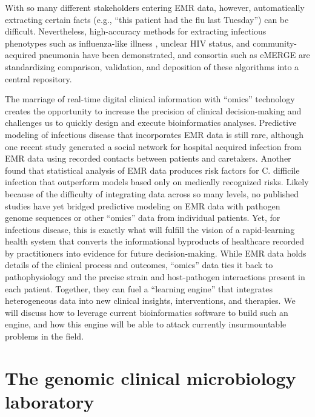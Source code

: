With so many different stakeholders entering EMR data, however, automatically extracting certain facts (e.g., “this patient had the flu last Tuesday”) can be difficult. Nevertheless, high-accuracy methods for extracting infectious phenotypes such as influenza-like illness , unclear HIV status,\autocite{Felsen2014} and community-acquired pneumonia\autocite{DeLisle2013} have been demonstrated, and consortia such as eMERGE are standardizing comparison, validation, and deposition of these algorithms into a central repository.\autocite{Pathak2013a}

The marriage of real-time digital clinical information with “omics” technology creates the opportunity to increase the precision of clinical decision-making and challenges us to quickly design and execute bioinformatics analyses. Predictive modeling of infectious disease that incorporates EMR data is still rare, although one recent study generated a social network for hospital acquired infection from EMR data using recorded contacts between patients and caretakers.\autocite{Cusumano-Towner2013} Another found that statistical analysis of EMR data produces risk factors for C. difficile infection that outperform models based only on medically recognized risks.\autocite{Wiens2014} Likely because of the difficulty of integrating data across so many levels, no published studies have yet bridged predictive modeling on EMR data with pathogen genome sequences or other “omics” data from individual patients. Yet, for infectious disease, this is exactly what will fulfill the vision of a rapid-learning health system \autocite{Care2014,Kohane2012} that converts the informational byproducts of healthcare recorded by practitioners into evidence for future decision-making. While EMR data holds details of the clinical process and outcomes, “omics” data ties it back to pathophysiology and the precise strain and host-pathogen interactions present in each patient. Together, they can fuel a “learning engine” that integrates heterogeneous data into new clinical insights, interventions, and therapies. We will discuss how to leverage current bioinformatics software to build such an engine, and how this engine will be able to attack currently insurmountable problems in the field.

\section{The genomic clinical microbiology laboratory}

